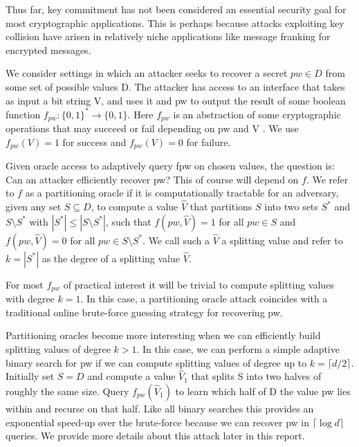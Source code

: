Thus far, key commitment has not been considered an essential security goal for most cryptographic applications.
This is perhaps because attacks exploiting key collision have arisen in relatively niche applications like
message franking for encrypted messages.

\hfill \break

We consider settings in which an attacker seeks to recover a secret $pw \in D$ from some set
of possible values D.
The attacker has access to an interface that takes as input a bit string V, and uses it and pw to
output the result of some boolean function $f_{pw}: \{0,1\}^\ast \rightarrow \{0,1\}$.
Here $f_{pw}$ is an abstraction of some cryptographic operations that may succeed or fail
depending on pw and V .
We use $f_{pw}(V) = 1$ for success and $f_{pw}(V) = 0$ for failure.

Given oracle access to adaptively query fpw on chosen values, the question is: Can an attacker efficiently recover pw?
This of course will depend on $f$.
We refer to $f$ as a partitioning oracle if it is computationally tractable for an adversary,
given any set $S \subseteq D$, to compute a value $\hat{V}$ that
partitions $S$ into two sets $S^\ast$ and $S \setminus S^\ast$ with $| S^\ast | \leq |S \setminus S^\ast|$,
such that $f(pw,\hat{V}) = 1$ for all $pw \in S$ and $f(pw,\hat{V}) = 0$ for all $pw \in S \setminus S^\ast$.
We call such a $\hat{V}$ a splitting value and refer to $k = |S^{*}|$ as the degree of a splitting value $\hat{V}$.

\hfill \break

For most $f_{pw}$ of practical interest it will be trivial to compute splitting values with degree $k = 1$.
In this case, a partitioning oracle attack coincides with a traditional online
brute-force guessing strategy for recovering pw.

Partitioning oracles become more interesting when we can efficiently build splitting values of degree $k > 1$.
In this case, we can perform a simple adaptive binary search for pw if we can compute splitting values of degree up
to $k = \lceil d/2 \rceil$.
Initially set $S = D$ and compute a value $\hat{V}_1$ that splits S into two halves of roughly the same size.
Query $f_{pw}(\hat{V}_1)$ to learn which half of D the value pw lies within and recurse on that half.
Like all binary searches this provides an exponential speed-up over the brute-force
because we can recover pw in $\lceil \log d \rceil $ queries.
We provide more details about this attack later in this report.

